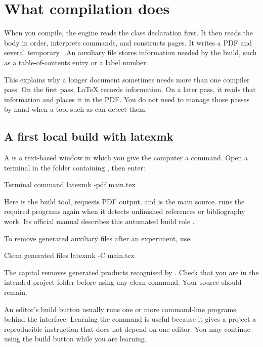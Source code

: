 \section{What compilation does}

When you compile, the engine reads the class declaration first. It then reads
the body in order, interprets commands, and constructs pages. It writes a PDF
and several temporary . An auxiliary file stores
information needed by the build, such as a table-of-contents entry or a label
number.

This explains why a longer document sometimes needs more than one compiler
pass. On the first pass, \LaTeX{} records information. On a later pass, it reads
that information and places it in the PDF. You do not need to manage those
passes by hand when a tool such as  can detect them.

\subsection{A first local build with latexmk}
\label{sec:latexmk-first}

A  is a text-based window in which you give the computer a
command. Open a terminal in the folder containing , then enter:

\begin{terminalcode}{Terminal command}
latexmk -pdf main.tex
\end{terminalcode}

Here  is the build tool,  requests PDF output, and
 is the main source.  runs the required programs
again when it detects unfinished references or bibliography work. Its official
manual describes this automated build role \parencite{latexmkCTAN}.

To remove generated auxiliary files after an experiment, use:

\begin{terminalcode}{Clean generated files}
latexmk -C main.tex
\end{terminalcode}

The capital  removes generated products recognised by
. Check that you are in the intended project folder before using
any clean command. Your  source should remain.

\begin{advancedtopic}
An editor's build button usually runs one or more command-line programs behind
the interface. Learning the  command is useful because it gives a
project a reproducible instruction that does not depend on one editor. You may
continue using the build button while you are learning.
\end{advancedtopic}

